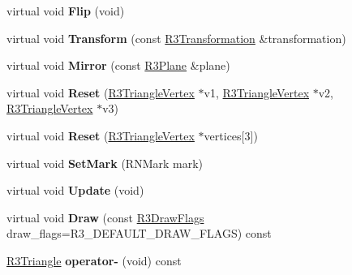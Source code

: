 \begin{DoxyCompactItemize}
\item 
virtual void {\bfseries Flip} (void)\hypertarget{class_r3_triangle_a573a5268c792b47a35e5f6437b665f17}{}\label{class_r3_triangle_a573a5268c792b47a35e5f6437b665f17}

\item 
virtual void {\bfseries Transform} (const \hyperlink{class_r3_transformation}{R3\+Transformation} \&transformation)\hypertarget{class_r3_triangle_a730bccc677aaa67e2f177c48cf2d7216}{}\label{class_r3_triangle_a730bccc677aaa67e2f177c48cf2d7216}

\item 
virtual void {\bfseries Mirror} (const \hyperlink{class_r3_plane}{R3\+Plane} \&plane)\hypertarget{class_r3_triangle_aa250f51abf0ccfcd8d7082459a1c5d3b}{}\label{class_r3_triangle_aa250f51abf0ccfcd8d7082459a1c5d3b}

\item 
virtual void {\bfseries Reset} (\hyperlink{class_r3_triangle_vertex}{R3\+Triangle\+Vertex} $\ast$v1, \hyperlink{class_r3_triangle_vertex}{R3\+Triangle\+Vertex} $\ast$v2, \hyperlink{class_r3_triangle_vertex}{R3\+Triangle\+Vertex} $\ast$v3)\hypertarget{class_r3_triangle_aaf67e47d486d2ebe54471cee222a683a}{}\label{class_r3_triangle_aaf67e47d486d2ebe54471cee222a683a}

\item 
virtual void {\bfseries Reset} (\hyperlink{class_r3_triangle_vertex}{R3\+Triangle\+Vertex} $\ast$vertices\mbox{[}3\mbox{]})\hypertarget{class_r3_triangle_ad36d2c040d44a7f94cc31ac64da02719}{}\label{class_r3_triangle_ad36d2c040d44a7f94cc31ac64da02719}

\item 
virtual void {\bfseries Set\+Mark} (R\+N\+Mark mark)\hypertarget{class_r3_triangle_aa529e1bc6f7797b3b53679f8d4d4f640}{}\label{class_r3_triangle_aa529e1bc6f7797b3b53679f8d4d4f640}

\item 
virtual void {\bfseries Update} (void)\hypertarget{class_r3_triangle_a09e3ad912f617a32e599a729043a2d0c}{}\label{class_r3_triangle_a09e3ad912f617a32e599a729043a2d0c}

\item 
virtual void {\bfseries Draw} (const \hyperlink{class_r_n_flags}{R3\+Draw\+Flags} draw\+\_\+flags=R3\+\_\+\+D\+E\+F\+A\+U\+L\+T\+\_\+\+D\+R\+A\+W\+\_\+\+F\+L\+A\+GS) const \hypertarget{class_r3_triangle_a0415686c5cba40a6e39217beab808d10}{}\label{class_r3_triangle_a0415686c5cba40a6e39217beab808d10}

\item 
\hyperlink{class_r3_triangle}{R3\+Triangle} {\bfseries operator-\/} (void) const \hypertarget{class_r3_triangle_abe0aea5253de3754712fa7d30bdbc4ab}{}\label{class_r3_triangle_abe0aea5253de3754712fa7d30bdbc4ab}


\end{DoxyCompactItemize}
